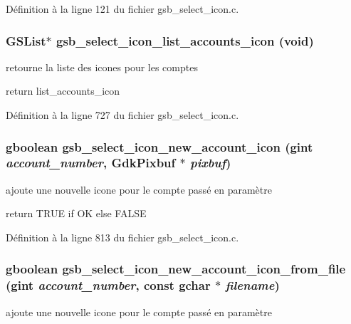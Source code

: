 Définition à la ligne 121 du fichier gsb\_\-select\_\-icon.c.

\subsubsection[{gsb\_\-select\_\-icon\_\-list\_\-accounts\_\-icon}]{\setlength{\rightskip}{0pt plus 5cm}GSList$\ast$ gsb\_\-select\_\-icon\_\-list\_\-accounts\_\-icon (void)}\label{gsb__select__icon_8c_a7072d49b909a1b5b537eacfaae4eed60}
retourne la liste des icones pour les comptes

return list\_\-accounts\_\-icon 

Définition à la ligne 727 du fichier gsb\_\-select\_\-icon.c.

\subsubsection[{gsb\_\-select\_\-icon\_\-new\_\-account\_\-icon}]{\setlength{\rightskip}{0pt plus 5cm}gboolean gsb\_\-select\_\-icon\_\-new\_\-account\_\-icon (gint {\em account\_\-number}, \/  GdkPixbuf $\ast$ {\em pixbuf})}\label{gsb__select__icon_8c_a8dd950442da88096e64568acd27675b5}
ajoute une nouvelle icone pour le compte passé en paramètre

return TRUE if OK else FALSE 

Définition à la ligne 813 du fichier gsb\_\-select\_\-icon.c.

\subsubsection[{gsb\_\-select\_\-icon\_\-new\_\-account\_\-icon\_\-from\_\-file}]{\setlength{\rightskip}{0pt plus 5cm}gboolean gsb\_\-select\_\-icon\_\-new\_\-account\_\-icon\_\-from\_\-file (gint {\em account\_\-number}, \/  const gchar $\ast$ {\em filename})}\label{gsb__select__icon_8c_a3f81b2b7b83a4137cf42f373ca0ec0a8}
ajoute une nouvelle icone pour le compte passé en paramètre

